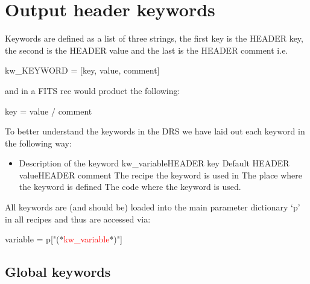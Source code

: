 \chapter{Output header keywords}
\label{ch:output_keywords}


Keywords are defined as a list of three strings, the first key is the HEADER key, the second is the HEADER value and the last is the HEADER comment i.e.
\begin{pythonbox}
kw_KEYWORD = [key, value, comment]
\end{pythonbox}
\noindent and in a FITS rec would product the following:
\begin{cmdboxprint}
key     = value              / comment
\end{cmdboxprint}

\vspace{1cm}
\noindent To better understand the keywords in the DRS we have laid out each keyword in the following way:
\begin{itemize}
\item {}
{Description of the keyword}
{kw\_variable}{HEADER key}
{Default HEADER value}{HEADER comment}
{The recipe the keyword is used in}
{The place where the keyword is defined}
{The code where the keyword is used.}
\end{itemize}

\begin{note}
All keywords are (and should be) loaded into the main parameter dictionary `p' in all recipes and thus are accessed via: 
\begin{pythonbox}
variable = p["(*\textcolor{red}{kw\_variable}*)"]
\end{pythonbox}
\end{note}

\clearpage
\newpage
\section{Global keywords}
\label{ch:output_keywords:global}

